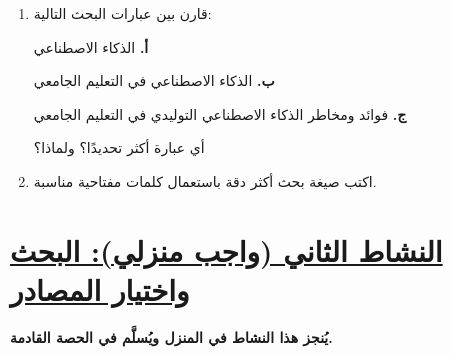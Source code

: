 \documentclass[a4paper]{article}
\begin{document}
\begin{enumerate}

\item قارن بين عبارات البحث التالية:

\begin{center}

\textbf{أ.} الذكاء الاصطناعي

\vspace{0.15cm}

\textbf{ب.} الذكاء الاصطناعي في التعليم الجامعي

\vspace{0.15cm}

\textbf{ج.} فوائد ومخاطر الذكاء الاصطناعي التوليدي
في التعليم الجامعي

\end{center}

أي عبارة أكثر تحديدًا؟ ولماذا؟


\item اكتب صيغة بحث أكثر دقة باستعمال كلمات مفتاحية
مناسبة.


\end{enumerate}


\section*{\khatt\underline{النشاط الثاني (واجب منزلي): البحث واختيار المصادر}}

\textbf{يُنجز هذا النشاط في المنزل ويُسلَّم في الحصة القادمة.}
\end{document}
